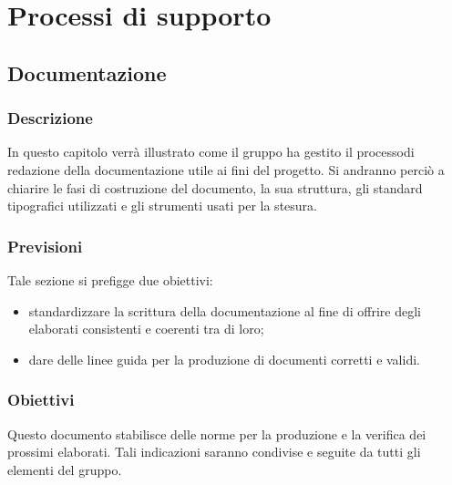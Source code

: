 \section{Processi di supporto}
    \subsection{Documentazione}
        \subsubsection{Descrizione}
            In questo capitolo verrà illustrato come il gruppo ha gestito il processo\glosp di redazione della documentazione utile ai fini del progetto\glo.
            Si andranno perciò a chiarire le fasi di costruzione del documento, la sua struttura, gli standard tipografici utilizzati e gli strumenti
            usati per la stesura.
        \subsubsection{Previsioni}
            Tale sezione si prefigge due obiettivi:
            \begin{itemize}
                \item standardizzare la scrittura della documentazione al fine di offrire degli elaborati consistenti e coerenti tra di loro;
                \item dare delle linee guida per la produzione di documenti corretti e validi.
            \end{itemize}
        \subsubsection{Obiettivi}
            Questo documento stabilisce delle norme per la produzione e la verifica dei prossimi elaborati. Tali indicazioni saranno condivise e seguite
            da tutti gli elementi del gruppo.
